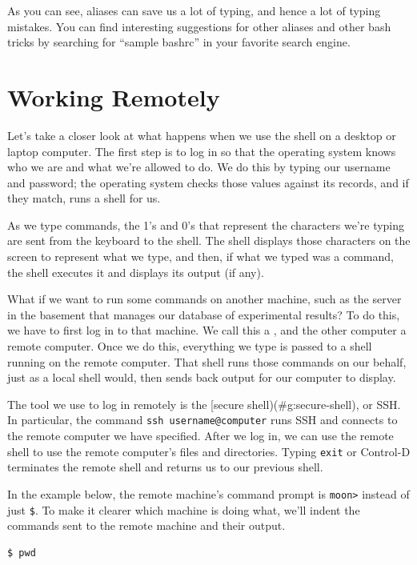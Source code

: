 \documentclass{book}
\begin{document}
As you can see, aliases can save us a lot of typing, and hence a lot of
typing mistakes. You can find interesting suggestions for other aliases
and other bash tricks by searching for ``sample bashrc'' in your
favorite search engine.

\section{Working Remotely}

Let's take a closer look at what happens when we use the shell on a
desktop or laptop computer. The first step is to log in so that the
operating system knows who we are and what we're allowed to do. We do
this by typing our username and password; the operating system checks
those values against its records, and if they match, runs a shell for
us.

As we type commands, the 1's and 0's that represent the characters we're
typing are sent from the keyboard to the shell. The shell displays those
characters on the screen to represent what we type, and then, if what we
typed was a command, the shell executes it and displays its output (if
any).

What if we want to run some commands on another machine, such as the
server in the basement that manages our database of experimental
results? To do this, we have to first log in to that machine. We call
this a , and the other computer a
remote computer. Once we do this, everything we type is passed to a
shell running on the remote computer. That shell runs those commands on
our behalf, just as a local shell would, then sends back output for our
computer to display.

The tool we use to log in remotely is the {[}secure
shell)(\#g:secure-shell), or SSH. In particular, the command
\texttt{ssh username@computer} runs SSH and connects to the remote
computer we have specified. After we log in, we can use the remote shell
to use the remote computer's files and directories. Typing \texttt{exit}
or Control-D terminates the remote shell and returns us to our previous
shell.

In the example below, the remote machine's command prompt is
\texttt{moon\textgreater{}} instead of just \texttt{\$}. To make it
clearer which machine is doing what, we'll indent the commands sent to
the remote machine and their output.

\begin{verbatim}
$ pwd
\end{verbatim}
\end{document}

